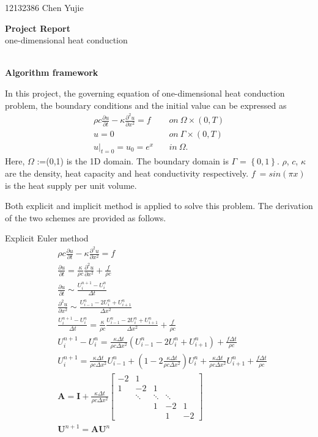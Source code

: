 \documentclass[a4paper,10pt]{article}
\begin{document}
12132386 Chen Yujie
\begin{center}
\LARGE \textbf {Project Report}\\
{\large one-dimensional heat conduction}
\\ \hspace*{\fill} \\
\end{center}

\large \textbf {Algorithm framework}

In this project, the governing equation of one-dimensional heat conduction problem, the boundary conditions and the initial value can be expressed as
\begin{align}
\rho c\frac{\partial u}{\partial t}-\kappa \frac{\partial ^2 u}{\partial x^2}=f \quad &on\  \Omega \times (0,T) \\
u=0 \quad &on \  \Gamma \times (0,T) \\
u|_{t=0} =u_0 =  e^x \quad &in \ \Omega .
\end{align}
Here, $\Omega$ :=(0,1) is the 1D domain. The boundary domain is $\Gamma$ = $\left\{ 0,1 \right\} $. $\rho$, $c$, $\kappa$ are the density, heat capacity and heat conductivity respectively. $f \ =sin(\pi x)$ is the heat supply per unit volume. 

Both explicit and implicit method is applied to solve this problem. The derivation of the two schemes are provided as follows.

Explicit Euler method
\begin{align*}
& \rho c \frac{\partial u}{\partial t} - \kappa \frac{\partial ^2 u}{\partial x^2} = f \\
& \frac{\partial u}{\partial t} = \frac{\kappa}{\rho c} \frac{\partial ^2 u}{\partial x^2} + \frac{f}{\rho c} \\
& \frac{\partial u}{\partial t} \sim \frac{U_i^{n+1} - U_i^n}{\Delta t} \\
& \frac{\partial ^2 u}{\partial x^2} \sim \frac{U_{i-1}^n - 2 U_i^n + U_{i+1}^n}{\Delta x^2} \\
& \frac{U_i^{n+1} - U_i^n}{\Delta t} = \frac{\kappa}{\rho c} \frac{U_{i-1}^n - 2 U_i^n + U_{i+1}^n}{\Delta x^2} + \frac{f}{\rho c} \\
& U_i^{n+1} - U_i^n = \frac{\kappa \Delta t}{\rho c \Delta x^2} ( U_{i-1}^n - 2 U_i^n + U_{i+1}^n ) + \frac{f \Delta t}{\rho c} \\
& U_i^{n+1} = \frac{\kappa \Delta t}{\rho c \Delta x^2} U_{i-1}^n + ( 1 - 2 \frac{\kappa \Delta t}{\rho c \Delta x^2} ) U_i^n + \frac{\kappa \Delta t}{\rho c \Delta x^2} U_{i+1}^n + \frac{f \Delta t}{\rho c} \\
& \bm A = \bm I + \frac{\kappa \Delta t}{\rho c \Delta x^2}
\begin{bmatrix}
-2 & 1  & \  & \  & \  \\
1  & -2 & 1  & \  & \  \\
\  & \ddots & \ddots & \ddots & \ \\
\  & \  & 1  & -2 & 1  \\
\  & \  & \  & 1  & -2 
\end{bmatrix} \\
& \bm U^{n+1} = \bm A \bm U^n
\end{align*}
\end{document}
